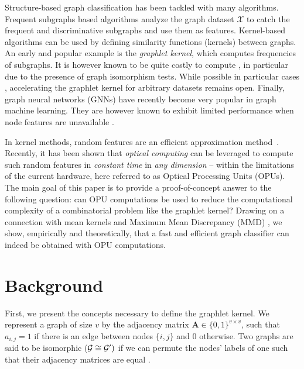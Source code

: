 \documentclass{article}
\begin{document}
Structure-based graph classification has been tackled with many algorithms. Frequent subgraphs based algorithms \cite{frequent_subgraphs} analyze the graph dataset $\mathcal{X}$ to catch the frequent and discriminative subgraphs and use them as features. Kernel-based algorithms \cite{kriege_graph_kernels} can be used by defining similarity functions (kernels) between graphs. An early and popular example is the \emph{graphlet kernel}, which computes frequencies of subgraphs. It is however known to be quite costly to compute \cite{graphlet_kernel}, in particular due to the presence of graph isomorphism tests. While possible in particular cases \cite{graphlet_kernel}, accelerating the graphlet kernel for arbitrary datasets remains open.
Finally, graph neural networks (GNNs) \cite{Bruna2013, Bronstein2017} have recently become very popular in graph machine learning. They are however known to exhibit limited performance when node features are unavailable \cite{GCN_powerful}. %

In kernel methods, random features are an efficient approximation method~\cite{rahimi2008random, RF_1}. Recently, it has been shown \cite{saade_opu} that \emph{optical computing} can be leveraged to compute such random features in \emph{constant time} in \emph{any dimension} -- within the limitations of the current hardware, here referred to as Optical Processing Units (OPUs).
The main goal of this paper is to provide a proof-of-concept answer to the following question: can OPU computations be used to reduce the computational complexity of a combinatorial problem like the graphlet kernel? Drawing on a connection with mean kernels and Maximum Mean Discrepancy (MMD) \cite{Gretton2007}, we show, empirically and theoretically, that a fast and efficient graph classifier can indeed be obtained with OPU computations.

\section{Background}
\label{sec:background}
First, we present the concepts necessary to define the graphlet kernel. We represent a graph of size $v$ by the adjacency matrix $\mathbf{A}\in \{0,1\}^{v\times v}$, such that $a_{i,j} =1$ if there is an edge between nodes $\{i,j\}$ and $0$ otherwise. Two graphs are said to be isomorphic ($\mathcal{G}\cong \mathcal{G}')$ if we can permute the nodes' labels of one such that their adjacency matrices are equal \cite{isomorphism}. 
\end{document}

